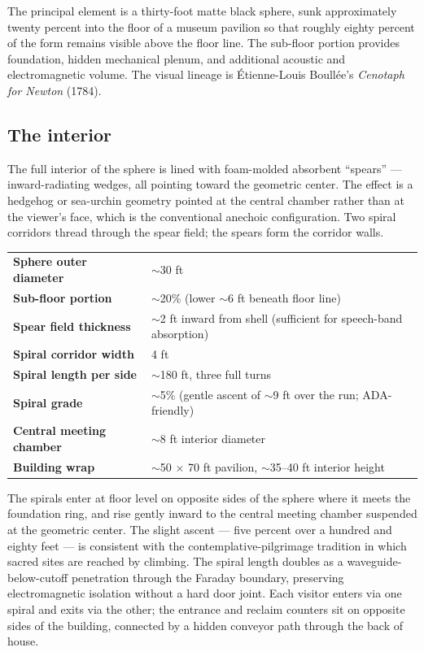 \documentclass[]{anvil-installation}
\begin{document}
The principal element is a thirty-foot matte black sphere, sunk approximately twenty percent into the floor of a museum pavilion so that roughly eighty percent of the form remains visible above the floor line. The sub-floor portion provides foundation, hidden mechanical plenum, and additional acoustic and electromagnetic volume. The visual lineage is Étienne-Louis Boullée's \textit{Cenotaph for Newton} (1784).

\subsection{The interior}

The full interior of the sphere is lined with foam-molded absorbent ``spears'' --- inward-radiating wedges, all pointing toward the geometric center. The effect is a hedgehog or sea-urchin geometry pointed at the central chamber rather than at the viewer's face, which is the conventional anechoic configuration. Two spiral corridors thread through the spear field; the spears form the corridor walls.

\begin{metricbox}
\begin{tabularx}{\textwidth}{@{} >{\bfseries}l X @{}}
Sphere outer diameter & $\sim$30 ft \\
Sub-floor portion & $\sim$20\% (lower $\sim$6 ft beneath floor line) \\
Spear field thickness & $\sim$2 ft inward from shell (sufficient for speech-band absorption) \\
Spiral corridor width & 4 ft \\
Spiral length per side & $\sim$180 ft, three full turns \\
Spiral grade & $\sim$5\% (gentle ascent of $\sim$9 ft over the run; ADA-friendly) \\
Central meeting chamber & $\sim$8 ft interior diameter \\
Building wrap & $\sim$50 $\times$ 70 ft pavilion, $\sim$35--40 ft interior height \\
\end{tabularx}
\end{metricbox}

The spirals enter at floor level on opposite sides of the sphere where it meets the foundation ring, and rise gently inward to the central meeting chamber suspended at the geometric center. The slight ascent --- five percent over a hundred and eighty feet --- is consistent with the contemplative-pilgrimage tradition in which sacred sites are reached by climbing. The spiral length doubles as a waveguide-below-cutoff penetration through the Faraday boundary, preserving electromagnetic isolation without a hard door joint. Each visitor enters via one spiral and exits via the other; the entrance and reclaim counters sit on opposite sides of the building, connected by a hidden conveyor path through the back of house.
\end{document}
